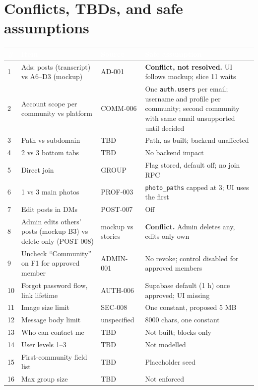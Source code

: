 \documentclass[11pt,a4paper]{article}
\newcommand{\hdr}[1]{\textcolor{white}{\textbf{#1}}}
\newcommand{\code}[1]{\texttt{\small #1}}
\begin{document}
\section{Conflicts, TBDs, and safe assumptions}\label{sec:tbd}
{\small
{}
\begin{longtable}{L{0.5cm} L{6cm} L{2.2cm} L{6.2cm}}
\hdr{\#} & \hdr{Item} & \hdr{Source} & \hdr{Safe assumption}\\
 & Ads: posts (transcript) vs A6--D3 (mockup) & AD-001 & \textbf{Conflict, not resolved.} UI follows mockup; slice 11 waits\\
2 & Account scope per community vs platform & COMM-006 & One \code{auth.users} per email; username and profile per community; second community with same email unsupported until decided\\
3 & Path vs subdomain & TBD & Path, as built; backend unaffected\\
4 & 2 vs 3 bottom tabs & TBD & No backend impact\\
5 & Direct join & GROUP & Flag stored, default off; no join RPC\\
6 & 1 vs 3 main photos & PROF-003 & \code{photo\_paths} capped at 3; UI uses the first\\
7 & Edit posts in DMs & POST-007 & Off\\
8 & Admin edits others' posts (mockup B3) vs delete only (POST-008) & mockup vs stories & \textbf{Conflict.} Admin deletes any, edits only own\\
9 & Uncheck ``Community'' on F1 for approved member & ADMIN-001 & No revoke; control disabled for approved members\\
10 & Forgot password flow, link lifetime & AUTH-006 & Supabase default (1 h) once approved; UI missing\\
11 & Image size limit & SEC-008 & One constant, proposed 5 MB\\
12 & Message body limit & unspecified & 8000 chars, one constant\\
13 & Who can contact me & TBD & Not built; blocks only\\
14 & User levels 1--3 & TBD & Not modelled\\
15 & First-community field list & TBD & Placeholder seed\\
16 & Max group size & TBD & Not enforced\\

\end{longtable}}
\end{document}
